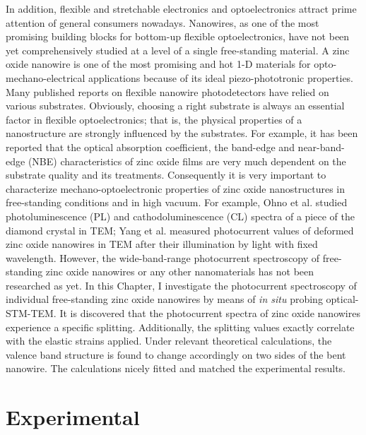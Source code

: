 In addition, flexible and stretchable electronics and optoelectronics attract prime attention of general consumers nowadays. 
Nanowires, as one of the most promising building blocks for bottom-up flexible optoelectronics, have not been yet comprehensively studied at a level of a single free-standing material. 
A zinc oxide nanowire is one of the most promising and hot 1-D materials for opto-mechano-electrical applications because of its ideal piezo-phototronic properties.\cite{L.2011a,L.2010,Xu2015b,L.2010a} 
Many published reports on flexible nanowire photodetectors have relied on various substrates.\cite{G.2015,H.2014,G.2014} 
Obviously, choosing a right substrate is always an essential factor in flexible optoelectronics; that is, the physical properties of a nanostructure are strongly influenced by the substrates. 
For example, it has been reported that the optical absorption coefficient, the band-edge and near-band-edge (NBE) characteristics of zinc oxide films are very much dependent on the substrate quality and its treatments.\cite{R.1997} 
Consequently it is very important to characterize mechano-optoelectronic properties of zinc oxide nanostructures in free-standing conditions and in high vacuum. 
For example, Ohno et al. studied photoluminescence (PL) and cathodoluminescence (CL) spectra of a piece of the diamond crystal in TEM;\cite{S.1995} 
Yang et al. measured photocurrent values of deformed zinc oxide nanowires in TEM after their illumination by light with fixed wavelength.\cite{E.2012} 
However, the wide-band-range photocurrent spectroscopy of free-standing zinc oxide nanowires or any other nanomaterials has not been researched as yet. 
In this Chapter, I investigate the photocurrent spectroscopy of individual free-standing zinc oxide nanowires by means of {\em in situ} probing optical-STM-TEM. 
It is discovered that the photocurrent spectra of zinc oxide nanowires experience a specific splitting. Additionally, the splitting values exactly correlate with the elastic strains applied. 
Under relevant theoretical calculations, the valence band structure is found to change accordingly on two sides of the bent nanowire. The calculations nicely fitted and matched the experimental results. 

\section{Experimental}

